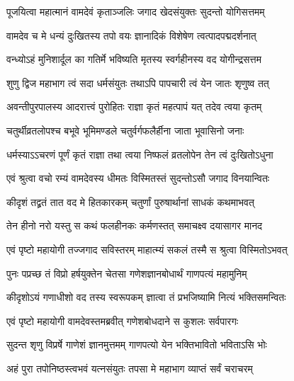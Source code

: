\twolineshloka
{पूजयित्वा महात्मानं वामदेवं कृताञ्जलिः}
{जगाद खेदसंयुक्तः सुदन्तो योगिसत्तमम्} %


\twolineshloka
{वामदेव च मे धन्यं दुःखितस्य तपो वयः}
{ज्ञानादिकं विशेषेण त्वत्पादपद्मदर्शनात्} %

\twolineshloka
{वन्ध्योऽहं मुनिशार्दूल का गतिर्मे भविष्यति}
{मृतस्य स्वर्गहीनस्य वद योगीन्द्रसत्तम} %


\twolineshloka
{शुणु द्विज महाभाग त्वं सदा धर्मसंयुतः}
{तथाऽपि पापचारी त्वं येन जातः श‍ृणुष्व तत्} %

\twolineshloka
{अवन्तीपुरपालस्य आदरात्त्वं पुरोहितः}
{राज्ञा कृतं महत्पापं यत् तदेव त्वया कृतम्} %

\twolineshloka
{चतुर्थीव्रतलोपश्च बभूवे भूमिमण्डले}
{चतुर्वर्गफलैर्हीना जाता भूवासिनो जनाः} %

\twolineshloka
{धर्मस्याऽऽचरणं पूर्णं कृतं राज्ञा तथा त्वया}
{निष्फलं व्रतलोपेन तेन त्वं दुःखितोऽधुना} %

\twolineshloka
{एवं श्रुत्वा वचो रम्यं वामदेवस्य धीमतः}
{विस्मितस्तं सुदन्तोऽसौ जगाद विनयान्वितः} %


\twolineshloka
{कीदृशं तद्व्रतं तात वद मे हितकारकम्}
{चतुर्णां पुरुषार्थानां साधकं कथमाभवत्} %

\twolineshloka
{तेन हीनो नरो यस्तु स कथं फलहीनकः}
{कर्मणस्तत् समाचक्ष्व दयासागर मानद} %


\twolineshloka
{एवं पृष्टो महायोगी तज्जगाद सविस्तरम्}
{माहात्म्यं सकलं तस्मै स श्रुत्वा विस्मितोऽभवत्} %

\twolineshloka
{पुनः पप्रच्छ तं विप्रो हर्षयुक्तेन चेतसा}
{गणेशज्ञानबोधार्थं गाणपत्यं महामुनिम्} %


\twolineshloka
{कीदृशोऽयं गणाधीशो वद तस्य स्वरूपकम्}
{ज्ञात्वा तं प्रभजिष्यामि नित्यं भक्तिसमन्वितः} %

\twolineshloka
{एवं पृष्टो महायोगी वामदेवस्तमब्रवीत्}
{गणेशबोधदाने स कुशलः सर्वपारगः} %


\twolineshloka
{सुदन्त श‍ृणु विप्रर्षे गाणेशं ज्ञानमुत्तमम्}
{गाणपत्यो येन भक्तिभावितो भविताऽसि भोः} %

\twolineshloka
{अहं पुरा तपोनिष्ठस्त्वभवं यत्नसंयुतः}
{तपसा मे महाभाग व्याप्तं सर्वं चराचरम्} %

